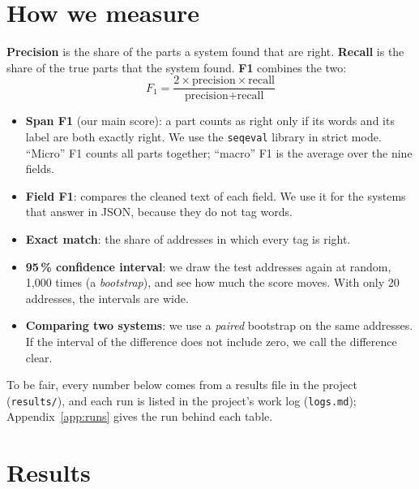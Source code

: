 \documentclass[11pt,a4paper]{article}
\newcommand{\code}[1]{\texttt{#1}}
\begin{document}
\section{How we measure}\label{sec:measure}
\textbf{Precision} is the share of the parts a system found that are right. \textbf{Recall} is the share of the true
parts that the system found. \textbf{F1} combines the two:
\[
F_1 = \frac{2 \times \text{precision} \times \text{recall}}{\text{precision} + \text{recall}}
\]
\begin{itemize}
\item \textbf{Span F1} (our main score): a part counts as right only if its words and its label are both exactly
right. We use the \code{seqeval} library in strict mode. ``Micro'' F1 counts all parts together; ``macro'' F1 is the
average over the nine fields.
\item \textbf{Field F1}: compares the cleaned text of each field. We use it for the systems that answer in JSON,
because they do not tag words.
\item \textbf{Exact match}: the share of addresses in which every tag is right.
\item \textbf{95\,\% confidence interval}: we draw the test addresses again at random, 1,000 times (a
\emph{bootstrap}), and see how much the score moves. With only 20 addresses, the intervals are wide.
\item \textbf{Comparing two systems}: we use a \emph{paired} bootstrap on the same addresses. If the interval of the
difference does not include zero, we call the difference clear.
\end{itemize}
To be fair, every number below comes from a results file in the project (\code{results/}), and each run is listed in
the project's work log (\code{logs.md}); Appendix~\ref{app:runs} gives the run behind each table.

\section{Results}
\end{document}
